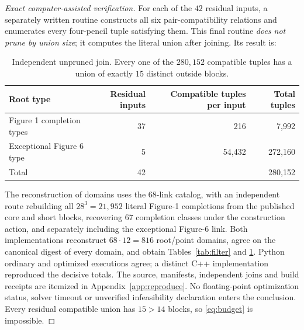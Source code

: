 \documentclass[11pt]{article}
\theoremstyle{definition}
\theoremstyle{remark}
\begin{document}
\begin{proof}[Exact computer-assisted verification]
For each of the $42$ residual inputs, a separately written routine
constructs all six pair-compatibility relations and enumerates every
four-pencil tuple satisfying them. This final routine
\emph{does not prune by union size}; it computes the literal union
after joining. Its result is:
\begin{table}[ht]
\centering\small
\begin{tabular}{@{}lrrr@{}}
\toprule
Root type & Residual inputs & Compatible tuples per input
 & Total tuples \\
\midrule
Figure 1 completion types & 37 & 216 & 7,992\\
Exceptional Figure 6 type & 5 & 54,432 & 272,160\\
\midrule
Total & 42 & & 280,152\\
\bottomrule
\end{tabular}
\caption{Independent unpruned join. Every one of the $280{,}152$
compatible tuples has a union of exactly $15$ distinct outside blocks.}
\label{tab:join}
\end{table}

The reconstruction of domains uses the $68$-link catalog,
with an independent route rebuilding all $28^3=21{,}952$ literal
Figure-1 completions from the published core and short blocks,
recovering $67$ completion classes under the construction action,
and separately including the exceptional Figure-6 link.
Both implementations reconstruct $68\cdot12=816$ root/point domains,
agree on the canonical digest of every domain, and obtain
Tables~\ref{tab:filter} and \ref{tab:join}.
Python ordinary and optimized executions agree; a distinct C++
implementation reproduced the decisive totals. The source, manifests,
independent joins and build receipts are itemized in
Appendix~\ref{app:reproduce}. No floating-point optimization
status, solver timeout or unverified infeasibility declaration enters
the conclusion. Every residual compatible union has $15>14$ blocks,
so \eqref{eq:budget} is impossible.
\end{proof}
\end{document}
